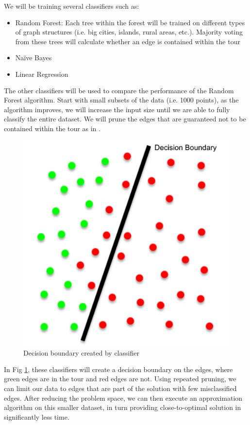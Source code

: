 \documentclass[]{UCD_CS_FYP_Report}
\begin{document}
We will be training several classifiers such as:
\begin{itemize}
    \item Random Forest: Each tree within the forest will be trained on different types of graph structures (i.e. big cities, islands, rural areas, etc.). Majority voting from these trees will calculate whether an edge is contained within the tour
    \item Naïve Bayes
    \item Linear Regression
\end{itemize}

The other classifiers will be used to compare the performance of the Random Forest algorithm.
Start with small subsets of the data (i.e. 1000 points), as the algorithm improves, we will increase the input size until we are able to fully classify the entire dataset.
We will prune the edges that are guaranteed not to be contained within the tour as in \cite{iAAA}. 

\newpage
\begin{figure}[h]
    \centering
  \includegraphics[width=0.5\linewidth]{Figures/Prune.pdf}
  \caption{Decision boundary created by classifier}
  \label{fig:Prune}
\end{figure}
In Fig \ref{fig:Prune}, these classifiers will create a decision boundary on the edges, where green edges are in the tour and red edges are not. Using repeated pruning, we can limit our data to edges that are part of the solution with few misclassified edges. After reducing the problem space, we can then execute an approximation algorithm on this smaller dataset, in turn providing close-to-optimal solution in significantly less time.


\end{document}
